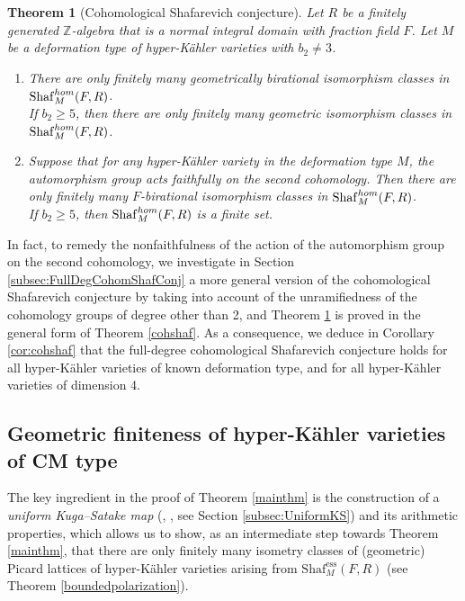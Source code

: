 \documentclass[11pt,reqno,oneside]{amsart}
\numberwithin{equation}{section}
\newtheorem{theorem}{Theorem}[section]
\theoremstyle{definition}
\DeclareMathOperator{\ess}{ess}
\renewcommand{\hom}{{\rm hom}}
\newcommand{\Sha}{\mathrm{Shaf}}
\newcommand{\ZZ}{\mathbb{Z}}
\begin{document}
\begin{theorem}[{Cohomological Shafarevich conjecture}]
\label{mainthm-cohom}
Let $R$ be a finitely generated $\ZZ$-algebra that is a normal integral domain with fraction field $F$. Let $M$ be a deformation type of hyper-Kähler varieties with $b_2\neq 3$.
\begin{enumerate}
    \item [(i)] There are only finitely many geometrically birational isomorphism classes in  $\Sha_M^{\hom }(F,R)$.\\ If $b_2\geq 5$, then there are only finitely many geometric isomorphism classes in $\Sha_M^{\hom}(F,R)$. 
     \item [(ii)] Suppose that for any hyper-Kähler variety in the deformation type $M$, the automorphism group acts faithfully on the second cohomology. Then there are only finitely many $F$-birational isomorphism classes in  $\Sha_M^{\hom}(F,R)$.\\ If $b_2\geq 5$,  then $\Sha_M^{\hom}(F,R)$ is a finite set.
\end{enumerate}
\end{theorem}  

In fact, to remedy the nonfaithfulness of the action of the automorphism group on the second cohomology, we investigate in Section \ref{subsec:FullDegCohomShafConj} a more general version of the cohomological Shafarevich conjecture by taking into account of the unramifiedness of the cohomology groups of degree other than 2, and Theorem \ref{mainthm-cohom} is proved in the general form of Theorem \ref{cohshaf}. As a consequence, we deduce in Corollary \ref{cor:cohshaf} that the full-degree cohomological Shafarevich conjecture holds for all hyper-Kähler varieties of known deformation type, and for all hyper-Kähler varieties of dimension 4. 

    

 
\subsection{Geometric finiteness of hyper-Kähler varieties of CM type} 
The key ingredient in the proof of Theorem \ref{mainthm} is the construction of a \textit{uniform Kuga--Satake map} (\cite{OrrSkorobogatov}, \cite{Sh17}, see Section \ref{subsec:UniformKS}) and its arithmetic properties,
which allows us to show, as an intermediate step towards Theorem \ref{mainthm}, that there are only finitely many isometry classes of (geometric) Picard lattices of hyper-Kähler varieties arising from  $\Sha_M^{\ess}(F,R)$ (see Theorem \ref{boundedpolarization}). 
\end{document}

